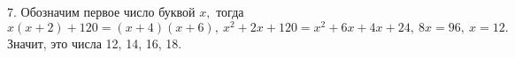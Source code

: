 7. Обозначим первое число буквой $x,$ тогда $x(x+2)+120=(x+4)(x+6),\ x^2+2x+120=x^2+6x+4x+24,\ 8x=96,\ x=12.$ Значит, это числа 12, 14, 16, 18.\\
